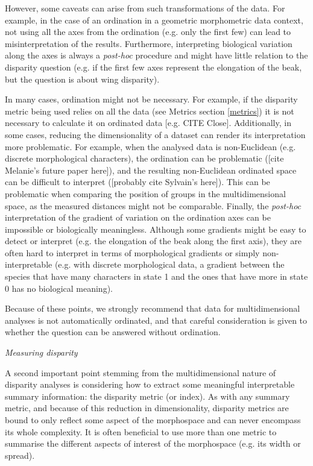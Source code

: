 \documentclass[12pt,letterpaper]{article}
\renewcommand{\subsection}[1]{%
\bigskip
\begin{center}
\begin{large}
\normalfont\itshape #1
\end{large}
\end{center}}
\begin{document}
However, some caveats can arise from such transformations of the data.
For example, in the case of an ordination in a geometric morphometric data context, not using all the axes from the ordination (e.g. only the first few) can lead to misinterpretation of the results.
Furthermore, interpreting biological variation along the axes is always a \textit{post-hoc} procedure and might have little relation to the disparity question (e.g. if the first few axes represent the elongation of the beak, but the question is about wing disparity).

In many cases, ordination might not be necessary.
For example, if the disparity metric being used relies on all the data (see Metrics section \ref{metrics}) it is not necessary to calculate it on ordinated data [e.g. CITE Close].
Additionally, in some cases, reducing the dimensionality of a dataset can render its interpretation more problematic.
For example, when the analysed data is non-Euclidean (e.g. discrete morphological characters), the ordination can be problematic ([cite Melanie's future paper here]), and the resulting non-Euclidean ordinated space can be difficult to interpret ([probably cite Sylvain's here]).
This can be problematic when comparing the position of groups in the multidimensional space, as the measured distances might not be comparable.
Finally, the \textit{post-hoc} interpretation of the gradient of variation on the ordination axes can be impossible or biologically meaningless.
Although some gradients might be easy to detect or interpret (e.g. the elongation of the beak along the first axis), they are often hard to interpret in terms of morphological gradients or simply non-interpretable (e.g. with discrete morphological data, a gradient between the species that have many characters in state 1 and the ones that have more in state 0 has no biological meaning).

Because of these points, we strongly recommend that data for multidimensional analyses is not automatically ordinated, and that careful consideration is given to whether the question can be answered without ordination.

\subsection{Measuring disparity}

A second important point stemming from the multidimensional nature of disparity analyses is considering how to extract some meaningful interpretable summary information: the disparity metric (or index).
As with any summary metric, and because of this reduction in dimensionality, disparity metrics are bound to only reflect some aspect of the morphospace and can never encompass its whole complexity.
It is often beneficial to use more than one metric to summarise the different aspects of interest of the morphospace (e.g. its width or spread).
\end{document}
